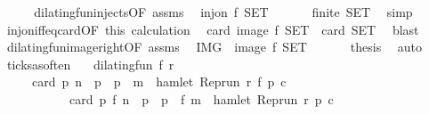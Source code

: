 \begin{isabellebody}
%
\endisadelimproof
%
\isatagproof
{}\isamarkupfalse%
\ {\isacharminus}\isanewline
\ \ \isamarkupfalse%
\ dilating{\isacharunderscore}fun{\isacharunderscore}injects{\isacharbrackleft}OF\ assms{\isacharbrackright}\ \isamarkupfalse%
\ {\isacartoucheopen}inj{\isacharunderscore}on\ f\ {\isacharquery}SET{\isacartoucheclose}\ \isacommand{{\isachardot}}\isamarkupfalse%
\isanewline
\ \ \isamarkupfalse%
\ \isamarkupfalse%
\ {\isacartoucheopen}finite\ {\isacharquery}SET{\isacartoucheclose}\ \isamarkupfalse%
\ simp\isanewline
\ \ \isamarkupfalse%
\ inj{\isacharunderscore}on{\isacharunderscore}iff{\isacharunderscore}eq{\isacharunderscore}card{\isacharbrackleft}OF\ this{\isacharbrackright}\ calculation\ \isamarkupfalse%
\ {\isacartoucheopen}card\ {\isacharparenleft}image\ f\ {\isacharquery}SET{\isacharparenright}\ {\isacharequal}\ card\ {\isacharquery}SET{\isacartoucheclose}\ \isamarkupfalse%
\ blast\isanewline
\ \ \isamarkupfalse%
\ \isamarkupfalse%
\ dilating{\isacharunderscore}fun{\isacharunderscore}image{\isacharunderscore}right{\isacharbrackleft}OF\ assms{\isacharbrackright}\ \isamarkupfalse%
\ {\isacartoucheopen}{\isacharquery}IMG\ {\isacharequal}\ image\ f\ {\isacharquery}SET{\isacartoucheclose}\ \isacommand{{\isachardot}}\isamarkupfalse%
\isanewline
\ \ \isamarkupfalse%
\ \isamarkupfalse%
\ {\isacharquery}thesis\ \isamarkupfalse%
\ auto\isanewline
{}\isamarkupfalse%
%
\endisatagproof
{\isafoldproof}%
%
\isadelimproof
\isanewline
%
\endisadelimproof
\isanewline
{}\isamarkupfalse%
\ ticks{\isacharunderscore}as{\isacharunderscore}often{\isacharcolon}\isanewline
\ \ \ {\isacartoucheopen}dilating{\isacharunderscore}fun\ f\ r{\isacartoucheclose}\isanewline
\ \ \ \ \ {\isacartoucheopen}card\ {\isacharbraceleft}p{\isachardot}\ n\ {\isasymle}\ p\ {\isasymand}\ p\ {\isasymle}\ m\ {\isasymand}\ hamlet\ {\isacharparenleft}{\isacharparenleft}Rep{\isacharunderscore}run\ r{\isacharparenright}\ {\isacharparenleft}f\ p{\isacharparenright}\ c{\isacharparenright}{\isacharbraceright}\isanewline
\ \ \ \ \ \ \ \ \ \ {\isacharequal}\ card\ {\isacharbraceleft}p{\isachardot}\ f\ n\ {\isasymle}\ p\ {\isasymand}\ p\ {\isasymle}\ f\ m\ {\isasymand}\ hamlet\ {\isacharparenleft}{\isacharparenleft}Rep{\isacharunderscore}run\ r{\isacharparenright}\ p\ c{\isacharparenright}{\isacharbraceright}{\isacartoucheclose}\isanewline

\end{isabellebody}
